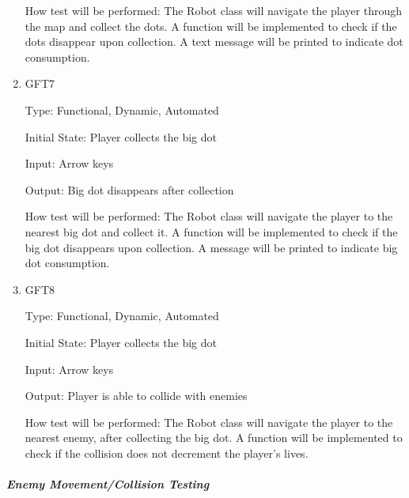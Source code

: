 \documentclass[12pt, titlepage]{article}
\begin{document}
\begin{enumerate}
How test will be performed: The Robot class will navigate the player through the map and collect the dots. A function will be implemented to check if the dots disappear upon collection. A text message will be printed to indicate dot consumption.

\item{GFT7\\}

Type: Functional, Dynamic, Automated
					
Initial State: Player collects the big dot
					
Input: Arrow keys
					
Output: Big dot disappears after collection

How test will be performed: The Robot class will navigate the player to the nearest big dot and collect it. A function will be implemented to check if the big dot disappears upon collection. A message will be printed to indicate big dot consumption.

\item{GFT8\\}

Type: Functional, Dynamic, Automated
					
Initial State: Player collects the big dot
					
Input: Arrow keys
					
Output: Player is able to collide with enemies

How test will be performed: The Robot class will navigate the player to the nearest enemy, after collecting the big dot. A function will be implemented to check if the collision does not decrement the player's lives.

\end{enumerate}

\subparagraph{Enemy Movement/Collision Testing}
\end{document}
